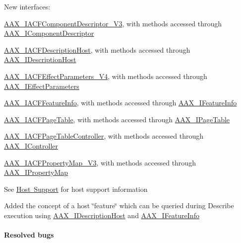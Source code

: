 \begin{DoxyItemize}
\item New interfaces\+: 
\begin{DoxyItemize}
\item \mbox{\hyperlink{a01633}{A\+A\+X\+\_\+\+I\+A\+C\+F\+Component\+Descriptor\+\_\+\+V3}}, with methods accessed through \mbox{\hyperlink{a01781}{A\+A\+X\+\_\+\+I\+Component\+Descriptor}} 
\item \mbox{\hyperlink{a01649}{A\+A\+X\+\_\+\+I\+A\+C\+F\+Description\+Host}}, with methods accessed through \mbox{\hyperlink{a01793}{A\+A\+X\+\_\+\+I\+Description\+Host}} 
\item \mbox{\hyperlink{a01685}{A\+A\+X\+\_\+\+I\+A\+C\+F\+Effect\+Parameters\+\_\+\+V4}}, with methods accessed through \mbox{\hyperlink{a01825}{A\+A\+X\+\_\+\+I\+Effect\+Parameters}} 
\item \mbox{\hyperlink{a01689}{A\+A\+X\+\_\+\+I\+A\+C\+F\+Feature\+Info}}, with methods accessed through \mbox{\hyperlink{a01829}{A\+A\+X\+\_\+\+I\+Feature\+Info}} 
\item \mbox{\hyperlink{a01725}{A\+A\+X\+\_\+\+I\+A\+C\+F\+Page\+Table}}, with methods accessed through \mbox{\hyperlink{a01849}{A\+A\+X\+\_\+\+I\+Page\+Table}} 
\item \mbox{\hyperlink{a01733}{A\+A\+X\+\_\+\+I\+A\+C\+F\+Page\+Table\+Controller}}, with methods accessed through \mbox{\hyperlink{a01789}{A\+A\+X\+\_\+\+I\+Controller}} 
\item \mbox{\hyperlink{a01753}{A\+A\+X\+\_\+\+I\+A\+C\+F\+Property\+Map\+\_\+\+V3}}, with methods accessed through \mbox{\hyperlink{a01869}{A\+A\+X\+\_\+\+I\+Property\+Map}} 
\end{DoxyItemize}See \mbox{\hyperlink{a00845}{Host Support}} for host support information  
\item Added the concept of a host \char`\"{}feature\char`\"{} which can be queried during Describe execution using \mbox{\hyperlink{a01793}{A\+A\+X\+\_\+\+I\+Description\+Host}} and \mbox{\hyperlink{a01829}{A\+A\+X\+\_\+\+I\+Feature\+Info}}  
\end{DoxyItemize}\hypertarget{a00847_aax_sdk_2p3p0_ResolvedBugs}{}\paragraph{Resolved bugs}\label{a00847_aax_sdk_2p3p0_ResolvedBugs}

